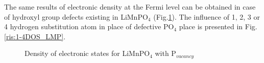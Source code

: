 The same results of electronic density at the Fermi level can be obtained in case of hydroxyl group defects existing in LiMnPO$_4$ (Fig.\ref{ris:0DOS_LMP}). The influence of 1, 2, 3 or 4 hydrogen substitution atom in place of defective PO$_4$ place is presented in Fig.\ref{ris:1-4DOS_LMP}.

\begin{figure}[ht]
\caption{Density of electronic states for LiMnPO$_4$ with P$_{vacancy}$}
\label{ris:0DOS_LMP}
\end{figure}

